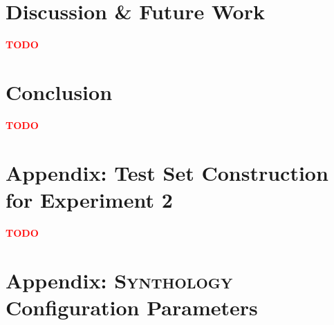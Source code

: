 \documentclass{IOS-Book-Article}     %
\newcommand{\notdone}{\textcolor{red}{\textbf{TODO}}}
\begin{document}
\section{Discussion \& Future Work}
\notdone

\section{Conclusion}
\notdone

\newpage

\appendix
\section{Appendix: Test Set Construction for Experiment 2}
\label{appendix:testset}
\notdone

\newpage
\section{Appendix: \textsc{Synthology} Configuration Parameters}
\end{document}
